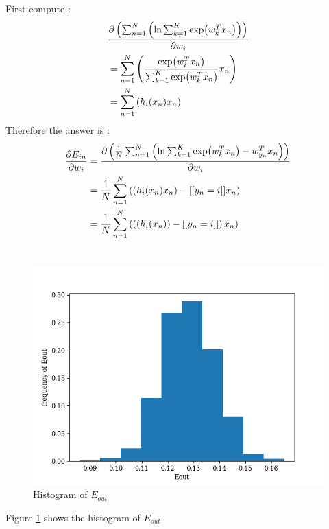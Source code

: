 \documentclass[12pt,a4paper]{article}
\begin{document}
\section{} %
First compute :
\[
	\begin{aligned}
		& \pdv{\left(\sum_{n=1}^{N} \left( \ln\sum_{k=1}^{K}
			\exp({w}_{k}^{T} x_{n})\right)\right)}{w_{i}} \\
		&= \sum_{n=1}^{N} \left( \frac{\exp({w}_{i}^{T} x_{n})}
			{\sum_{k=1}^{K} \exp({w}_{k}^{T} x_{n})}x_{n} \right) \\
		&= \sum_{n=1}^{N} \left( h_{i}(x_{n}) x_{n} \right) \\
	\end{aligned}
\]
Therefore the answer is :
\[
	\begin{aligned}
		\pdv{E_{in}}{w_{i}}
			&= \pdv{\left(\frac{1}{N} \sum_{n=1}^{N} \left( \ln \sum_{k=1}^{K} \exp({w}_{k}^{T}x_{n}) -
			{w}_{y_{n}}^{T}x_{n} \right) \right)}{w_{i}} \\
		&= \frac{1}{N} \sum_{n=1}^{N} \left( \left( h_{i}(x_{n}) x_{n} \right) -
			[[y_{n}=i]] x_{n} \right) \\
		&= \frac{1}{N} \sum_{n=1}^{N} \left( \left( \left( h_{i}(x_{n}) \right) -
			[[y_{n}=i]] \right) x_{n} \right) \\
	\end{aligned}
\]
\section{} %
\begin{figure}[h!]
	\centering
	\includegraphics[width=0.8\linewidth]{code/q7.png}
	\caption{Histogram of ${E}_{out}$}
	\label{fig:q7}
\end{figure}
Figure \ref{fig:q7} shows the histogram of ${E}_{out}$.
\end{document}
